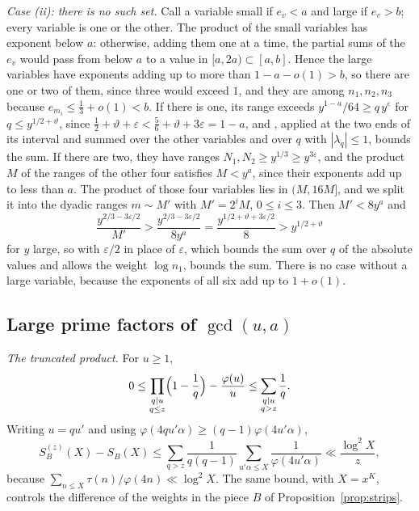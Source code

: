 \documentclass[aps,prd,twocolumn,superscriptaddress,nofootinbib,longbibliography,floatfix,showkeys,nobalancelastpage,amsmath,amssymb,10pt]{revtex4-2}
\theoremstyle{plain}
\theoremstyle{definition}
\theoremstyle{plain}
\newcommand{\eps}{\varepsilon}
\begin{document}
\emph{Case (ii): there is no such set.} Call a variable small if $e_v<a$ and large if $e_v>b$; every variable is one or the other. The product of the small variables has exponent below $a$: otherwise, adding them one at a time, the partial sums of the $e_v$ would pass from below $a$ to a value in $[a,2a)\subset[a,b]$. Hence the large variables have exponents adding up to more than $1-a-o(1)>b$, so there are one or two of them, since three would exceed $1$, and they are among $n_1,n_2,n_3$ because $e_{m_i}\le\frac13+o(1)<b$. If there is one, its range exceeds $y^{1-a}/64\ge q\,y^{\eps}$ for $q\le y^{1/2+\vartheta}$, since $\frac12+\vartheta+\eps<\frac56+\vartheta+3\eps=1-a$, and \cite[Lemma~5.4]{May2}, applied at the two ends of its interval and summed over the other variables and over $q$ with $|\lambda_q|\le1$, bounds the sum. If there are two, they have ranges $N_1,N_2\ge y^{1/3}\ge y^{3\eps}$, and the product $M$ of the ranges of the other four satisfies $M<y^a$, since their exponents add up to less than $a$. The product of those four variables lies in $(M,16M]$, and we split it into the dyadic ranges $m\sim M'$ with $M'=2^iM$, $0\le i\le3$. Then $M'<8y^a$ and
\[
\frac{y^{2/3-3\eps/2}}{M'}>\frac{y^{2/3-3\eps/2}}{8y^a}=\frac{y^{1/2+\vartheta+3\eps/2}}8>y^{1/2+\vartheta}
\]
for $y$ large, so \cite[Proposition~5.2]{May2} with $\eps/2$ in place of $\eps$, which bounds the sum over $q$ of the absolute values and allows the weight $\log n_1$, bounds the sum. There is no case without a large variable, because the exponents of all six add up to $1+o(1)$.

\subsection{Large prime factors of \texorpdfstring{$\gcd(u,a)$}{gcd(u,a)}}\label{app:large}

\emph{The truncated product.} For $u\ge1$,
\[
0\le\prod_{\substack{q\mid u\\ q\le z}}\Bigl(1-\frac1q\Bigr)-\frac{\varphi(u)}u\le\sum_{\substack{q\mid u\\ q>z}}\frac1q.
\]
Writing $u=qu'$ and using $\varphi(4qu'\alpha)\ge(q-1)\varphi(4u'\alpha)$,
\[
S_B^{(z)}(X)-S_B(X)\le\sum_{q>z}\frac1{q(q-1)}\sum_{u'\alpha\le X}\frac1{\varphi(4u'\alpha)}\ll\frac{\log^2X}z,
\]
because $\sum_{n\le X}\tau(n)/\varphi(4n)\ll\log^2X$. The same bound, with $X=x^K$, controls the difference of the weights in the piece $B$ of Proposition~\ref{prop:strips}.
\end{document}
